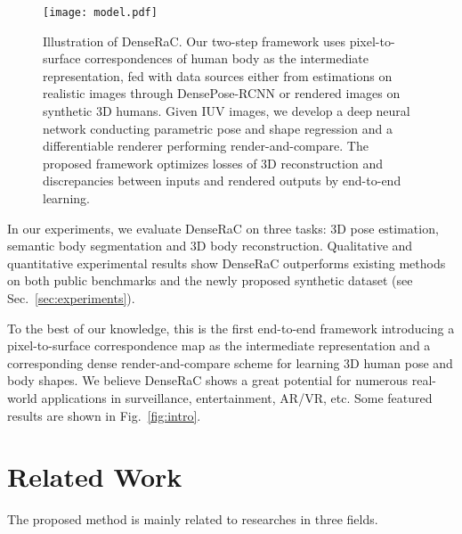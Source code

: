 \documentclass[10pt,twocolumn,letterpaper]{article}
\newcommand{\beforefigcaption}{\vspace{0mm}}
\newcommand{\afterfigcaption}{\vspace{0mm}}
\newcommand{\beforesection}{\vspace{0mm}}
\newcommand{\aftersection}{\vspace{0mm}}
\begin{document}
\begin{figure*}[ptb]
\centering
\texttt{[image: model.pdf]}
\beforefigcaption
\caption{Illustration of DenseRaC. Our two-step framework uses pixel-to-surface correspondences of human body as the intermediate representation, fed with data sources either from estimations on realistic images through DensePose-RCNN or rendered images on synthetic 3D humans. Given IUV images, we develop a deep neural network conducting parametric pose and shape regression and a differentiable renderer performing render-and-compare. The proposed framework optimizes losses of 3D reconstruction and discrepancies between inputs and rendered outputs by end-to-end learning.}
\afterfigcaption
\label{fig:model}
\end{figure*}

In our experiments, we evaluate DenseRaC on three tasks: 3D pose estimation, semantic body segmentation and 3D body reconstruction. Qualitative and quantitative experimental results show DenseRaC outperforms existing methods on both public benchmarks and the newly proposed synthetic dataset (see Sec.~\ref{sec:experiments}).

To the best of our knowledge, this is the first end-to-end framework introducing a pixel-to-surface correspondence map as the intermediate representation and a corresponding dense render-and-compare scheme for learning 3D human pose and body shapes. We believe DenseRaC shows a great potential for numerous real-world applications in surveillance, entertainment, AR/VR, etc. Some featured results are shown in Fig.~\ref{fig:intro}.

\beforesection
\section{Related Work}
\aftersection

The proposed method is mainly related to researches in three fields.
\end{document}
